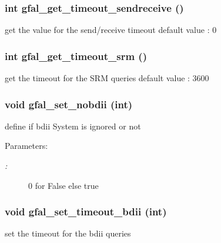 \subsubsection{\setlength{\rightskip}{0pt plus 5cm}int gfal\_\-get\_\-timeout\_\-sendreceive ()}\label{group__common__group_g198564ca7617a8f3dec7c6b925b2c760}


get the value for the send/receive timeout default value : 0 
\subsubsection{\setlength{\rightskip}{0pt plus 5cm}int gfal\_\-get\_\-timeout\_\-srm ()}\label{group__common__group_g31f524748949fca765e6fb8aa20ef41c}


get the timeout for the SRM queries default value : 3600 
\subsubsection{\setlength{\rightskip}{0pt plus 5cm}void gfal\_\-set\_\-nobdii (int)}\label{group__common__group_g267920b468d7578c10aa25469f8cadf7}


define if bdii System is ignored or not 

\begin{Desc}
\item[Parameters:]
\begin{description}
\item[{\em :}]0 for False else true \end{description}
\end{Desc}
\subsubsection{\setlength{\rightskip}{0pt plus 5cm}void gfal\_\-set\_\-timeout\_\-bdii (int)}\label{group__common__group_g7fc461515a2cdf649fd516319cb54ea9}


set the timeout for the bdii queries 
